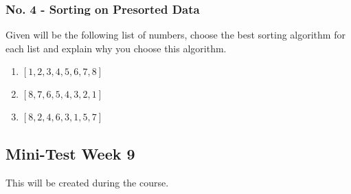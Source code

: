 \documentclass[10pt, oneside]{article}
\theoremstyle{remark}
\begin{document}
\subsubsection{No. 4 - Sorting on Presorted Data}
Given will be the following list of numbers, choose the best sorting algorithm for each list and explain why you choose this algorithm.
\begin{enumerate}
  \item $[1, 2, 3, 4, 5, 6, 7, 8]$
  \item $[8, 7, 6, 5, 4, 3, 2, 1]$
  \item $[8, 2, 4, 6, 3, 1, 5, 7]$
\end{enumerate}

\subsection{Mini-Test Week 9}
This will be created during the course.
\end{document}
